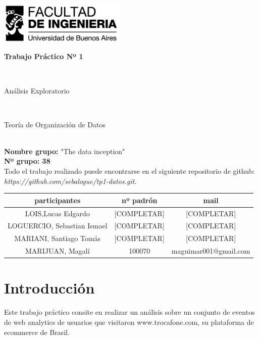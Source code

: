 \documentclass[titlepage,a4paper]{article}
\begin{document}
	\begin{titlepage}
		\hfill\includegraphics[width=6cm]{logofiuba.jpg}
		\center
		\vfill
		\vfill
		\begin{center}
			\begin{Huge}\textbf{Trabajo Práctico Nº 1}\end{Huge}\\
			\vfill
			\begin{huge}Análisis Exploratorio\end{huge}\\
			\vfill
			\begin{Large} Teoría de Organización de Datos\end{Large}\\

			\textbf{Nombre grupo:} "The data inception" \\
			\textbf{Nº grupo: 38}\\
				Todo el trabajo realizado puede encontrarse en el siguiente repositorio de github:\textit{ https://github.com/sebalogue/tp1-datos.git. }
	
			\vfill
			\begin{tabular}{|c|c|c|}
				\hline
				participantes & nº padrón & mail \\ \hline
				LOIS,Lucas Edgardo &[COMPLETAR] &  [COMPLETAR] \\ \hline		
				LOGUERCIO, Sebastian Ismael &[COMPLETAR] &  [COMPLETAR] \\ \hline
				MARIANI, Santiago Tomás &[COMPLETAR] &  [COMPLETAR] \\ \hline
				MARIJUAN, Magalí & 100070 & maguimar001@gmail.com\\ \hline
				
			\end{tabular}
			\vfill
			\vfill
			\vfill
			\vfill
			\vfill
			\vfill
		\end{center}
	
	\end{titlepage}

	\tableofcontents
	\newpage
	
	\section{Introducción}
	Este trabajo práctico consite en realizar un análisis sobre un conjunto de eventos de web analytics de usuarios que visitaron www.trocafone.com, su plataforma de ecommerce de Brasil.
	
\end{document}

